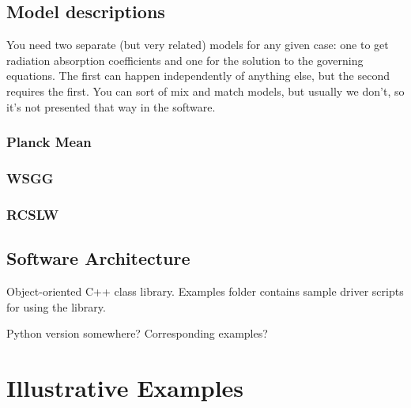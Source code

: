 \documentclass[preprint,12pt, a4paper]{elsarticle}
\begin{document}

\subsection{Model descriptions}
\label{s:models}

You need two separate (but very related) models for any given case: one to get radiation absorption coefficients and one for the solution to the governing equations. The first can happen independently of anything else, but the second requires the first. You can sort of mix and match models, but usually we don't, so it's not presented that way in the software. 

\subsubsection{Planck Mean}
\label{s:planckmean}

\subsubsection{WSGG}
\label{s:wsgg}

\subsubsection{RCSLW}
\label{s:RCSLW}

\subsection{Software Architecture}
\label{s:architechture}

Object-oriented C++ class library. Examples folder contains sample driver scripts for using the library. 

Python version somewhere? Corresponding examples?

\section{Illustrative Examples}
\label{s:Examples}
\end{document}
